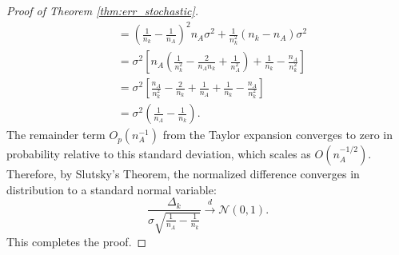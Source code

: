 \documentclass{article}
\theoremstyle{plain}
\newtheorem{lemma}[theorem]{Lemma}
\theoremstyle{definition}
\theoremstyle{remark}
\begin{document}
\begin{proof}[Proof of Theorem \ref{thm:err_stochastic}]
\begin{align}
    &= \left( \frac{1}{n_k} - \frac{1}{n_A} \right)^2 n_A \sigma^2 + \frac{1}{n_k^2} (n_k - n_A) \sigma^2 \nonumber \\
    &= \sigma^2 \left[ n_A \left( \frac{1}{n_k^2} - \frac{2}{n_A n_k} + \frac{1}{n_A^2} \right) + \frac{1}{n_k} - \frac{n_A}{n_k^2} \right] \nonumber \\
    &= \sigma^2 \left[ \frac{n_A}{n_k^2} - \frac{2}{n_k} + \frac{1}{n_A} + \frac{1}{n_k} - \frac{n_A}{n_k^2} \right] \nonumber \\
    &= \sigma^2 \left( \frac{1}{n_A} - \frac{1}{n_k} \right).
\end{align}
The remainder term $O_p(n_A^{-1})$ from the Taylor expansion converges to zero in probability relative to this standard deviation, which scales as $O(n_A^{-1/2})$.
Therefore, by Slutsky's Theorem, the normalized difference converges in distribution to a standard normal variable:
\begin{equation}
    \frac{\Delta_k}{\sigma \sqrt{\frac{1}{n_A} - \frac{1}{n_k}}} \xrightarrow{d} \mathcal{N}(0, 1).
\end{equation}
This completes the proof.
\end{proof}
\end{document}
